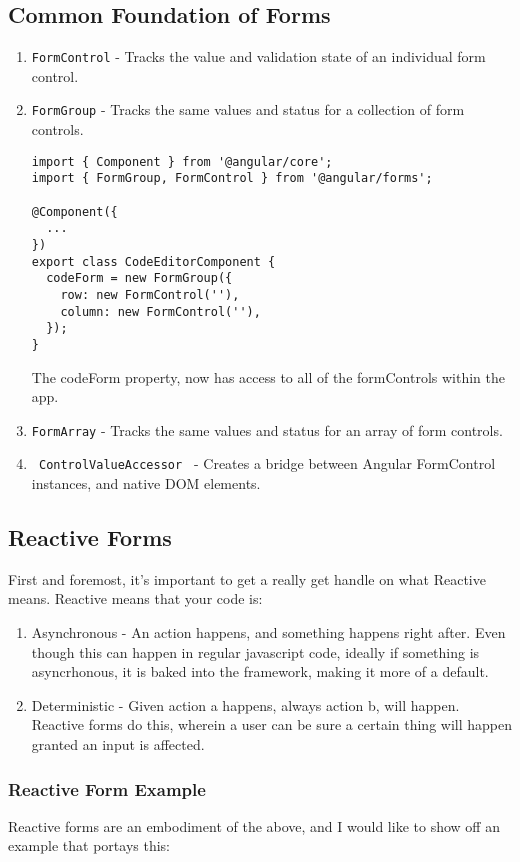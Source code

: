\subsection{ Common Foundation of Forms }
\begin{enumerate}
  \item \lstinline{FormControl} - Tracks the value and validation state of an 
  individual form control.
  \item \lstinline{FormGroup} - Tracks the same values and status for a 
  collection of form controls.
\begin{lstlisting}
import { Component } from '@angular/core';
import { FormGroup, FormControl } from '@angular/forms';
 
@Component({
  ...
})
export class CodeEditorComponent {
  codeForm = new FormGroup({
    row: new FormControl(''),
    column: new FormControl(''),
  });
}
\end{lstlisting}
  The codeForm property, now has access to all of the formControls within the
  app.
  \item \lstinline{FormArray} - Tracks the same values and status for an array
  of form controls. 
  \item \lstinline{ ControlValueAccessor } - Creates a bridge between Angular
  FormControl instances, and native DOM elements.
\end{enumerate}

\subsection{ Reactive Forms }
First and foremost, it's important to get a really get handle on what Reactive
means. Reactive means that your code is:
\begin{enumerate}
  \item Asynchronous - An action happens, and something happens right after. 
  Even though this can happen in regular javascript code, ideally if 
  something is asyncrhonous, it is baked into the framework, making it 
  more of a default.
  \item Deterministic -  Given action a happens, always action b, will 
  happen. Reactive forms do this, wherein a user can be sure a certain 
  thing will happen granted an input is affected.
\end{enumerate}

\subsubsection{ Reactive Form Example }
Reactive forms are an embodiment of the above, and I would like to show off an
example that portays this: 


